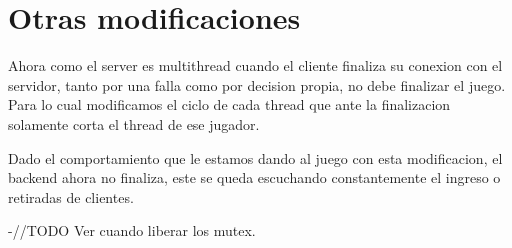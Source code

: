 \section{Otras modificaciones}

Ahora como el server es multithread cuando el cliente finaliza su conexion con el servidor, tanto por una falla como por decision propia, no debe finalizar el juego. Para lo cual modificamos el ciclo de cada thread que ante la finalizacion solamente corta el thread de ese jugador.

Dado el comportamiento que le estamos dando al juego con esta modificacion, el backend ahora no finaliza, este se queda escuchando constantemente el ingreso o retiradas de clientes.

-//TODO Ver cuando liberar los mutex.